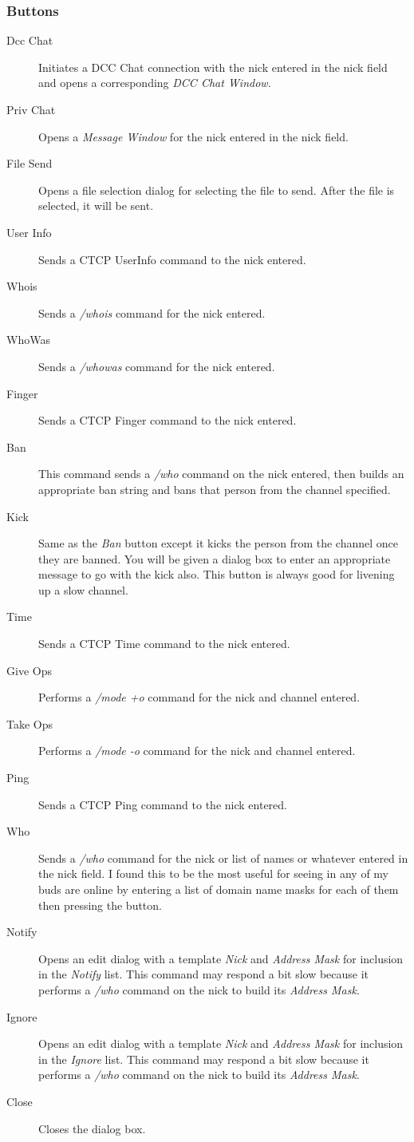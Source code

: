 \documentclass[titlepage]{article}
\begin{document}
\subsubsection{Buttons}
\begin{description}
\item[Dcc Chat] Initiates a DCC Chat connection with the nick entered
in the nick field and opens a corresponding \textit{DCC Chat Window}.
\item[Priv Chat] Opens a \textit{Message Window} for the nick entered
in the nick field.
\item[File Send] Opens a file selection dialog for selecting the file to 
send. After the file is selected, it will be sent.
\item[User Info] Sends a CTCP UserInfo command to the nick entered.  
\item[Whois] Sends a \textit{/whois} command for the nick entered.
\item[WhoWas] Sends a \textit{/whowas} command for the nick entered.
\item[Finger] Sends a CTCP Finger command to the nick entered.
\item[Ban] This command sends a \textit{/who} command on the nick
entered, then builds an appropriate ban string and bans that person
from the channel specified.
\item[Kick] Same as the \textit{Ban} button except it kicks the person
from the channel once they are banned. You will be given a dialog box
to enter an appropriate message to go with the kick also. This button
is always good for livening up a slow channel.
\item[Time] Sends a CTCP Time command to the nick entered.
\item[Give Ops] Performs a \textit{/mode +o} command for the nick and
channel entered.
\item[Take Ops] Performs a \textit{/mode -o} command for the nick and
channel entered.
\item[Ping] Sends a CTCP Ping command to the nick entered.
\item[Who] Sends a \textit{/who} command for the nick or list of names
or whatever entered in the nick field. I found this to be the most
useful for seeing in any of my buds are online by entering a list
of domain name masks for each of them then pressing the button.
\item[Notify] Opens an edit dialog with a template \emph{Nick} and
\emph{Address Mask} for inclusion in the \emph{Notify} list. This command
may respond a bit slow because it performs a \emph{/who} command on the
nick to build its \emph{Address Mask}.
\item[Ignore] Opens an edit dialog with a template \emph{Nick} and
\emph{Address Mask} for inclusion in the \emph{Ignore} list. This command
may respond a bit slow because it performs a \emph{/who} command on the
nick to build its \emph{Address Mask}.
\item[Close] Closes the dialog box.
\end{description}
\end{document}
